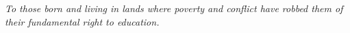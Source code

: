 \thispagestyle{empty}
\begin{flushright}
    \emph{To those born and living in lands where poverty and conflict have robbed them of their fundamental right to education.}
\end{flushright}


